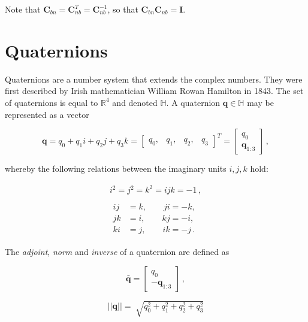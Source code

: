 \noindent
Note that $\mathbf{C}_{bn} = \mathbf{C}^T_{nb} = \mathbf{C}^{-1}_{nb}$, so that $\mathbf{C}^{ }_{bn} \mathbf{C}_{nb} = \mathbf{I}$.  

\section{Quaternions}

Quaternions are a number system that extends the complex numbers. They were first described by Irish mathematician William Rowan Hamilton in 1843. The set of quaternions is equal to $\mathbb{R}^4$ and denoted $\mathbb{H}$. A quaternion $\mathbf{q} \in \mathbb{H}$ may be represented as a vector

\begin{equation}
  \mathbf{q} = q_0 + q_1 i + q_2 j + q_3 k = \begin{bmatrix}
  	q_0, & q_1, & q_2, & q_3
  \end{bmatrix}^T = \begin{bmatrix}
  	q_0 \\ \mathbf{q}_{1:3} 
  \end{bmatrix}\,,
\end{equation}
 
\noindent
whereby the following relations between the imaginary units $i, j, k$ hold:

\begin{equation}
  \begin{matrix}
i^2 =j^2=k^2=ijk =-1\,,\\ \\
  {\begin{split}
  ij & = k, \qquad ji = -k, \\
jk & = i, \qquad kj = -i, \\
ki & = j, \qquad ik = -j\,.
\end{split}}
\end{matrix}
\end{equation}

The \emph{adjoint}, \emph{norm} and \emph{inverse} of a quaternion are defined as

\begin{equation}
  \bar{\mathbf{q}} = \begin{bmatrix}
  	q_0 \\ -\mathbf{q}_{1:3} 
  \end{bmatrix}\,,
\end{equation}

\begin{equation}
  ||\mathbf{q}|| = \sqrt[]{q_0^2 + q_1^2 + q_2^2 + q_3^2}
\end{equation}

